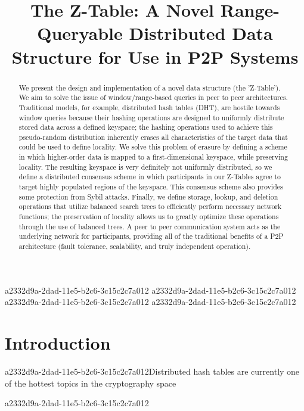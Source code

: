 \documentclass[12pt]{article}
\title{The Z-Table: A Novel Range-Queryable Distributed Data Structure for Use in P2P Systems}
\begin{document}
\maketitle

\begin{abstract}
We present the design and implementation of a novel data structure (the 'Z-Table'). We aim to solve the issue of window/range-based queries in peer to peer architectures. Traditional models, for example,  distributed hash tables (DHT), are hostile towards window queries because their hashing operations are designed to uniformly distribute stored data across a defined keyspace; the hashing operations used to achieve this pseudo-random distribution inherently erases all characteristics of the target data that could be used to define locality. We solve this problem of erasure by defining a scheme in which higher-order data is mapped to a first-dimensional keyspace, while preserving locality. The resulting keyspace is very definitely not uniformly distributed, so we define a distributed consensus scheme in which participants in our Z-Tables agree to target highly populated regions of the keyspace. This consensus scheme also provides some protection from Sybil attacks. Finally, we define storage, lookup, and deletion operations that utilize balanced search trees to efficiently perform necessary network functions; the preservation of locality allows us to greatly optimize these operations through the use of balanced trees. A peer to peer communication system acts as the underlying network for participants, providing all of the traditional benefits of a P2P architecture (fault tolerance, scalability, and truly independent operation).
\end{abstract}
a2332d9a-2dad-11e5-b2c6-3c15c2c7a012
a2332d9a-2dad-11e5-b2c6-3c15c2c7a012
a2332d9a-2dad-11e5-b2c6-3c15c2c7a012\newpage
a2332d9a-2dad-11e5-b2c6-3c15c2c7a012\section{Introduction}
a2332d9a-2dad-11e5-b2c6-3c15c2c7a012Distributed hash tables are currently one of the hottest topics in the cryptography space~\cite{Stoica:2001dj,Rowstron:2001ea,Ratnasamy:2001wn}

\printbibliography
a2332d9a-2dad-11e5-b2c6-3c15c2c7a012
\end{document}
